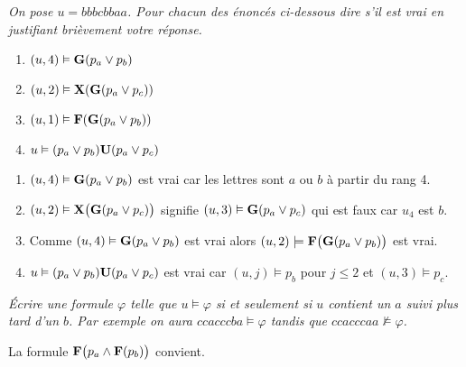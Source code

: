 \begin{Exercise}\it
On pose $u=bbbcbbaa$. 
Pour chacun des énoncés ci-dessous dire s'il est vrai en justifiant brièvement votre réponse.
\begin{enumerate}
  \item $(u,4)\vDash{\bf G}(p_a\vee p_b)$
  \item $(u,2)\vDash{\bf X}({\bf G}(p_a\vee p_c))$
  \item $(u,1)\vDash{\bf F}({\bf G}(p_a\vee p_b))$
  \item $u\vDash(p_a\vee p_b){\bf U}(p_a\vee p_c)$
\end{enumerate}
\end{Exercise}
\begin{Answer}
\begin{enumerate}
\item $(u, 4) \vDash  {\bf G}(p_a \vee p_b )$  est vrai car les lettres sont $a$ ou $b$ à partir du rang 4.
\item $(u, 2) \vDash {\bf X}\bigl({\bf G}(p_a \vee p_c )\bigr)$ signifie $(u, 3) \vDash  {\bf G}(p_a \vee p_c)$ qui est faux car $u_4$ est $b$.
\item Comme $(u, 4) \vDash  {\bf G}(p_a \vee p_b )$  est vrai alors $(u, 2) \models  {\bf F}\bigl({\bf G}(p_a \vee p_b )\bigr)$  est vrai.
\item $u \vDash (p_a \vee p_b ){\bf U}(p_a \vee p_c )$ est vrai car $(u, j) \vDash p_b$ pour $j  \le  2$ et $(u, 3) \models p_c$.
\end{enumerate}
\end{Answer}
\newpage
\begin{Exercise}\it
Écrire une formule $\varphi$ telle que $u\vDash \varphi$ si et seulement si $u$ contient un $a$ suivi plus tard d'un $b$. Par exemple on aura $ccacccba\vDash \varphi$ tandis que $ccacccaa\nvDash \varphi$.
\end{Exercise}
\begin{Answer}
La formule ${\bf F}\bigl(p_a \wedge {\bf F}(p_b)\bigr)$ convient.
\end{Answer}
